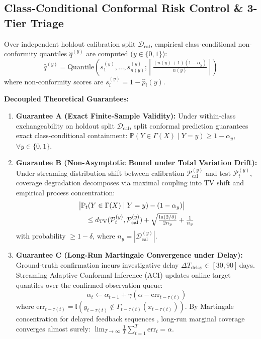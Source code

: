 \subsection{Class-Conditional Conformal Risk Control \& 3-Tier Triage}
\label{sec:conformal_triage}
Over independent holdout calibration split $\mathcal{D}_{\text{cal}}$, empirical class-conditional non-conformity quantiles $\hat{q}^{(y)}$ are computed ($y \in \{0, 1\}$):
\begin{equation}
\hat{q}^{(y)} = \text{Quantile}\left( s_1^{(y)}, \dots, s_{n(y)}^{(y)} ; \left\lceil \tfrac{(n(y) + 1)(1 - \alpha_y)}{n(y)} \right\rceil \right)
\label{eq:conformal_quantile}
\end{equation}
where non-conformity scores are $s_i^{(y)} = 1 - \hat{p}_i(y)$.

\textbf{Decoupled Theoretical Guarantees:}
\begin{enumerate}
    \item \textbf{Guarantee A (Exact Finite-Sample Validity):} Under within-class exchangeability on holdout split $\mathcal{D}_{\text{cal}}$, split conformal prediction guarantees exact class-conditional containment: $\mathbb{P}(Y \in \Gamma(X) \mid Y = y) \ge 1 - \alpha_y$, $\forall y \in \{0, 1\}$.
    \item \textbf{Guarantee B (Non-Asymptotic Bound under Total Variation Drift):} Under streaming distribution shift between calibration $\mathcal{P}_{\text{cal}}^{(y)}$ and test $\mathcal{P}_t^{(y)}$, coverage degradation decomposes via maximal coupling into TV shift and empirical process concentration:
    \begin{align}
    &\big| \mathbb{P}_{t}(Y \in \Gamma(X) \mid Y=y) - (1 - \alpha_y) \big| \notag \\
    &\quad \le d_{\mathrm{TV}}(\mathcal{P}_t^{(y)}, \mathcal{P}_{\text{cal}}^{(y)}) + \sqrt{\tfrac{\ln(2/\delta)}{2 n_y}} + \tfrac{1}{n_y}
    \end{align}
    with probability $\ge 1 - \delta$, where $n_y = |\mathcal{D}_{\text{cal}}^{(y)}|$.
    \item \textbf{Guarantee C (Long-Run Martingale Convergence under Delay):} Ground-truth confirmation incurs investigative delay $\Delta T_{\text{delay}} \in [30, 90]$\,days. Streaming Adaptive Conformal Inference (ACI) updates online target quantiles over the confirmed observation queue:
    \begin{equation}
    \alpha_t \leftarrow \alpha_{t-1} + \gamma (\alpha - \text{err}_{t - \tau(t)})
    \end{equation}
    where $\text{err}_{t - \tau(t)} = \mathbb{I}(y_{t - \tau(t)} \notin \Gamma_{t - \tau(t)}(x_{t - \tau(t)}))$. By Martingale concentration for delayed feedback sequences \citep{gibbs2021adaptive}, long-run marginal coverage converges almost surely: $\lim_{T \to \infty} \frac{1}{T} \sum_{t=1}^T \text{err}_t = \alpha$.
\end{enumerate}

